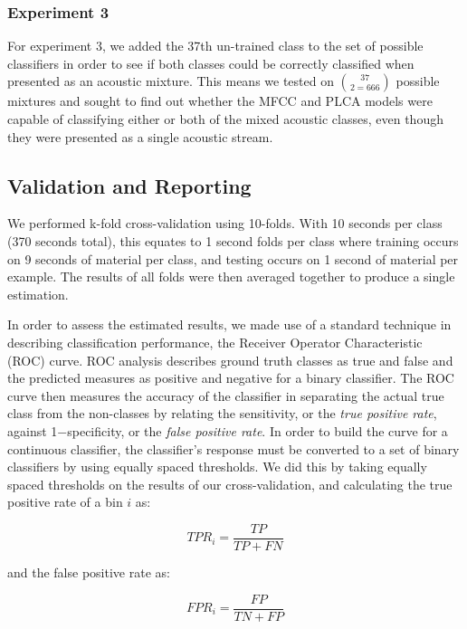 \documentclass[a4paper,11pt,final]{ThesisStyle}
\begin{document}
\subsubsection{Experiment 3}
For experiment 3, we added the 37th un-trained class to the set of possible classifiers in order to see if both classes could be correctly classified when presented as an acoustic mixture.  This means we tested on $37 \choose 2 = 666$ possible mixtures and sought to find out whether the MFCC and PLCA models were capable of classifying either or both of the mixed acoustic classes, even though they were presented as a single acoustic stream.


\subsection{Validation and Reporting}
\label{sec:ROC}
We performed k-fold cross-validation using 10-folds.  With 10 seconds per class (370 seconds total), this equates to 1 second folds per class where training occurs on 9 seconds of material per class, and testing occurs on 1 second of material per example. The results of all folds were then averaged together to produce a single estimation.

In order to assess the estimated results, we made use of a standard technique in describing classification performance, the Receiver Operator Characteristic (ROC) curve.  ROC analysis describes ground truth classes as true and false and the predicted measures as positive and negative for a binary classifier.  The ROC curve then measures the accuracy of the classifier in separating the actual true class from the non-classes by relating the sensitivity, or the \textit{true positive rate}, against 1$-$specificity, or the \textit{false positive rate}.   In order to build the curve for a continuous classifier, the classifier's response must be converted to a set of binary classifiers by using equally spaced thresholds.  We did this by taking equally spaced thresholds on the results of our cross-validation, and calculating the true positive rate of a bin $i$ as: 

\begin{equation}
TPR_i = \frac{TP}{TP + FN}
\end{equation}

and the false positive rate as: 

\begin{equation}
FPR_i = \frac{FP}{TN + FP}
\end{equation}
\end{document}

